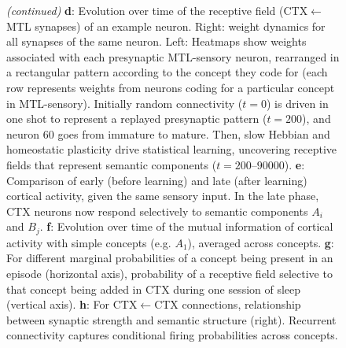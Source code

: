 \documentclass{article}
\begin{document}
\begin{figure}[t]
  \ContinuedFloat
  \captionsetup{list=off} %
  \caption{\textit{(continued)} \textbf{d}: Evolution over time of the receptive field (CTX$\leftarrow$MTL synapses) of an example neuron. Right: weight dynamics for all synapses of the same neuron. Left: Heatmaps show weights associated with each presynaptic MTL-sensory neuron, rearranged in a rectangular pattern according to the concept they code for (each row represents weights from neurons coding for a particular concept in MTL-sensory). Initially random connectivity ($t = 0$) is driven in one shot to represent a replayed presynaptic pattern ($t=200$), and neuron 60 goes from immature to mature. Then, slow Hebbian and homeostatic plasticity drive statistical learning, uncovering receptive fields that represent semantic components ($t = 200$--$90000$). \textbf{e}: Comparison of early (before learning) and late (after learning) cortical activity, given the same sensory input. In the late phase, CTX neurons now respond selectively to semantic components $A_i$ and $B_j$. \textbf{f}: Evolution over time of the mutual information of cortical activity with simple concepts (e.g. $A_1$), averaged across concepts. \textbf{g}: For different marginal probabilities of a concept being present in an episode (horizontal axis), probability of a receptive field selective to that concept being added in CTX during one session of sleep (vertical axis). \textbf{h}: For CTX$\leftarrow$CTX connections, relationship between synaptic strength and semantic structure (right). Recurrent connectivity captures conditional firing probabilities across concepts.}
\end{figure}
\newpage
\end{document}

